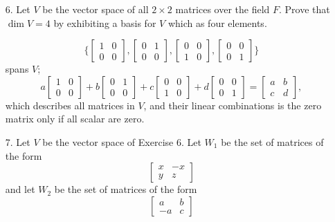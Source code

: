 \documentclass{article}
\begin{document}
\begin{enumerate}[listparindent=\parindent]
\item[6.] Let \(V\) be the vector space of all \(2 \times 2\) matrices over the field \(F\).
    Prove that \(\dim V = 4\) by exhibiting a basis for \(V\) which as four elements.

\[
    \{
        \begin{bmatrix} 1 & 0 \\ 0 & 0 \end{bmatrix},
        \begin{bmatrix} 0 & 1 \\ 0 & 0 \end{bmatrix},
        \begin{bmatrix} 0 & 0 \\ 1 & 0 \end{bmatrix},
        \begin{bmatrix} 0 & 0 \\ 0 & 1 \end{bmatrix}
    \}
\]
spans \(V\);
\[
    a \begin{bmatrix} 1 & 0 \\ 0 & 0 \end{bmatrix} +
    b \begin{bmatrix} 0 & 1 \\ 0 & 0 \end{bmatrix} +
    c \begin{bmatrix} 0 & 0 \\ 1 & 0 \end{bmatrix} +
    d \begin{bmatrix} 0 & 0 \\ 0 & 1 \end{bmatrix}
    =
    \begin{bmatrix}
        a & b \\
        c & d
    \end{bmatrix},
\]
which describes all matrices in \(V\), and their linear combinations is the zero matrix only if all scalar are zero.

\item[7.] Let \(V\) be the vector space of Exercise 6. Let \(W_1\) be the set of matrices of the form
    \[
        \begin{bmatrix}
            x & -x \\
            y & z
        \end{bmatrix}
    \]
    and let \(W_2\) be the set of matrices of the form
    \[
        \begin{bmatrix}
            a & b \\
            -a & c
        \end{bmatrix}
    \]


\end{enumerate}
\end{document}
